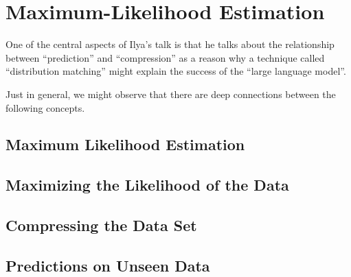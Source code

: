 \section{Maximum-Likelihood Estimation}

One of the central aspects of Ilya's talk is that he talks about the relationship between ``prediction'' and ``compression'' as a reason why a technique called ``distribution matching'' might explain the success of the ``large language model''.

Just in general, we might observe that there are deep connections between the following concepts.

\subsection{Maximum Likelihood Estimation}
\subsection{Maximizing the Likelihood of the Data}
\subsection{Compressing the Data Set}
\subsection{Predictions on Unseen Data}